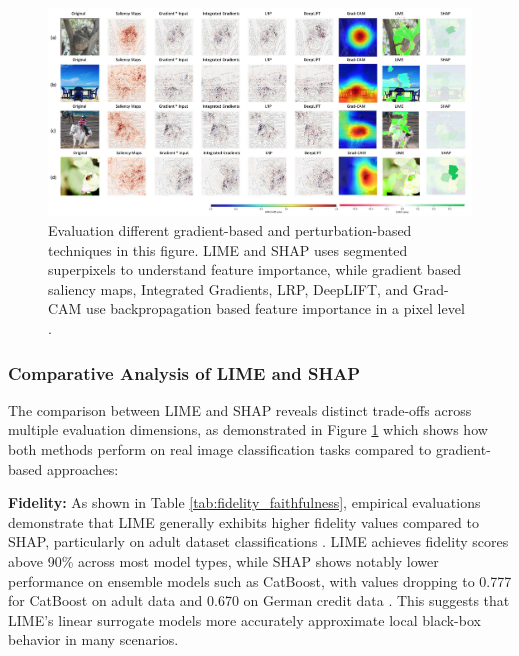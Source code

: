 \begin{figure}[ht]
\centering
\includegraphics[width=\textwidth]{images/xai_methods_comparison.png}
\caption{Evaluation different gradient-based and perturbation-based techniques in this figure. LIME and SHAP uses segmented superpixels to understand feature importance, while gradient based saliency maps, Integrated Gradients, LRP, DeepLIFT, and Grad-CAM use backpropagation based feature importance
in a pixel level \cite{das2020opportunities}.}
\label{fig:xai_methods_comparison}
\end{figure}

\subsubsection{Comparative Analysis of LIME and SHAP}

The comparison between LIME and SHAP reveals distinct trade-offs across multiple evaluation dimensions, as demonstrated in Figure \ref{fig:xai_methods_comparison} which shows how both methods perform on real image classification tasks compared to gradient-based approaches:

\textbf{Fidelity:} As shown in Table \ref{tab:fidelity_faithfulness}, empirical evaluations demonstrate that LIME generally exhibits higher fidelity values compared to SHAP, particularly on adult dataset classifications \cite{bodria2023benchmarking}. LIME achieves fidelity scores above 90\% across most model types, while SHAP shows notably lower performance on ensemble models such as CatBoost, with values dropping to 0.777 for CatBoost on adult data and 0.670 on German credit data \cite{bodria2023benchmarking}. This suggests that LIME's linear surrogate models more accurately approximate local black-box behavior in many scenarios.


